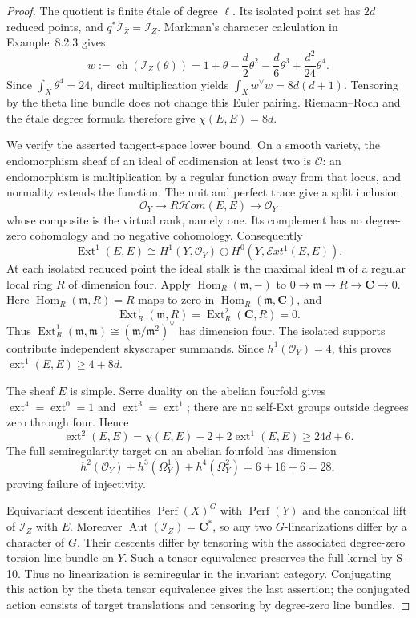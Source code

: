 \documentclass[11pt,a4paper]{article}
\theoremstyle{definition}
\begin{document}
\begin{proof}
The quotient is finite \'etale of degree $\ell$. Its isolated
point set has $2d$ reduced points, and
$q^*\mathcal I_{\bar Z}=\mathcal I_Z$.
Markman's character calculation in Example~8.2.3 gives
\[
 w:=\operatorname{ch}(\mathcal I_Z(\theta))
   =1+\theta-\frac d2\theta^2-\frac d6\theta^3
          +\frac{d^2}{24}\theta^4 .
\]
Since $\int_X\theta^4=24$, direct multiplication yields
$\int_X w^\vee w=8d(d+1)$. Tensoring by the theta line bundle
does not change this Euler pairing. Riemann--Roch and the
\'etale degree formula therefore give $\chi(E,E)=8d$.

We verify the asserted tangent-space lower bound. On a smooth
variety, the endomorphism sheaf of an ideal of codimension at
least two is $\mathcal O$: an endomorphism is multiplication
by a regular function away from that locus, and normality
extends the function. The unit and perfect trace give a split
inclusion
\[
 \mathcal O_Y\longrightarrow R\mathcal Hom(E,E)
       \longrightarrow\mathcal O_Y
\]
whose composite is the virtual rank, namely one. Its complement
has no degree-zero cohomology and no negative cohomology.
Consequently
\[
 \operatorname{Ext}^1(E,E)
 \cong H^1(Y,\mathcal O_Y)
       \oplus H^0(Y,\mathcal Ext^1(E,E)).
\]
At each isolated reduced point the ideal stalk is the maximal
ideal $\mathfrak m$ of a regular local ring $R$ of dimension
four. Apply $\operatorname{Hom}_R(\mathfrak m,-)$ to
$0\to\mathfrak m\to R\to\mathbf C\to0$.
Here $\operatorname{Hom}_R(\mathfrak m,R)=R$ maps to zero in
$\operatorname{Hom}_R(\mathfrak m,\mathbf C)$, and
\[
 \operatorname{Ext}^1_R(\mathfrak m,R)
   =\operatorname{Ext}^2_R(\mathbf C,R)=0.
\]
Thus
$\operatorname{Ext}^1_R(\mathfrak m,\mathfrak m)
\cong(\mathfrak m/\mathfrak m^2)^\vee$ has dimension four.
The isolated supports contribute independent skyscraper
summands. Since $h^1(\mathcal O_Y)=4$, this proves
$\operatorname{ext}^1(E,E)\ge4+8d$.

The sheaf $E$ is simple. Serre duality on the abelian fourfold
gives $\operatorname{ext}^4=\operatorname{ext}^0=1$ and
$\operatorname{ext}^3=\operatorname{ext}^1$; there are no
self-Ext groups outside degrees zero through four. Hence
\[
 \operatorname{ext}^2(E,E)
 =\chi(E,E)-2+2\operatorname{ext}^1(E,E)
 \ge24d+6.
\]
The full semiregularity target on an abelian fourfold has
dimension
\[
 h^2(\mathcal O_Y)+h^3(\Omega_Y^1)+h^4(\Omega_Y^2)
 =6+16+6=28,
\]
proving failure of injectivity.

Equivariant descent identifies
$\operatorname{Perf}(X)^G$ with $\operatorname{Perf}(Y)$
and the canonical lift of $\mathcal I_Z$ with $E$.
Moreover $\operatorname{Aut}(\mathcal I_Z)=\mathbf C^*$,
so any two $G$-linearizations differ by a character of $G$.
Their descents differ by tensoring with the associated
degree-zero torsion line bundle on $Y$. Such a tensor
equivalence preserves the full kernel by S-10.
Thus no linearization is semiregular in the invariant category.
Conjugating this action by the theta tensor equivalence gives
the last assertion; the conjugated action consists of target
translations and tensoring by degree-zero line bundles.
\end{proof}
\end{document}
